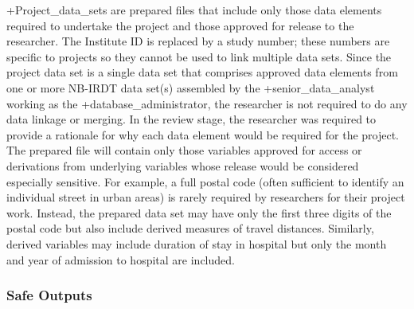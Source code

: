 \documentclass[
]{WileySix}
\begin{document}
+Project\_data\_sets\textbar{} are prepared files that include only those data elements required to undertake the project and those approved for release to the researcher. The Institute ID is replaced by a study number; these numbers are specific to projects so they cannot be used to link multiple data sets. Since the project data set is a single data set that comprises approved data elements from one or more NB-IRDT data set(s) assembled by the +senior\_data\_analyst\textbar{} working as the +database\_administrator\textbar, the researcher is not required to do any data linkage or merging. In the review stage, the researcher was required to provide a rationale for why each data element would be required for the project. The prepared file will contain only those variables approved for access or derivations from underlying variables whose release would be considered especially sensitive. For example, a full postal code (often sufficient to identify an individual street in urban areas) is rarely required by researchers for their project work. Instead, the prepared data set may have only the first three digits of the postal code but also include derived measures of travel distances. Similarly, derived variables may include duration of stay in hospital but only the month and year of admission to hospital are included.

\hypertarget{safe-outputs-2}{%
\subsubsection{Safe Outputs}\label{safe-outputs-2}}
\end{document}
